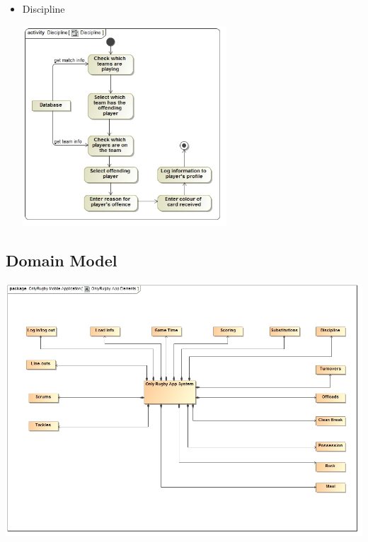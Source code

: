 \documentclass[a4paper,12pt]{report}
\begin{document}
\begin{itemize}
\begin{center}
		\end{center}
	\item Discipline
		\begin{center}
		\includegraphics[width=0.6\textwidth] {./Diagrams/DisciplineActivityDiagram.jpg}\\[0.4cm]
		\end{center}
\end{itemize}
\subsection{Domain Model}
	\begin{center}
  	 	\includegraphics[width=1\textwidth] {./HermanDiagrams/DomainModel.jpg}\\[0.4cm]    
	\end{center}
\newpage


{} 

\end{document}
